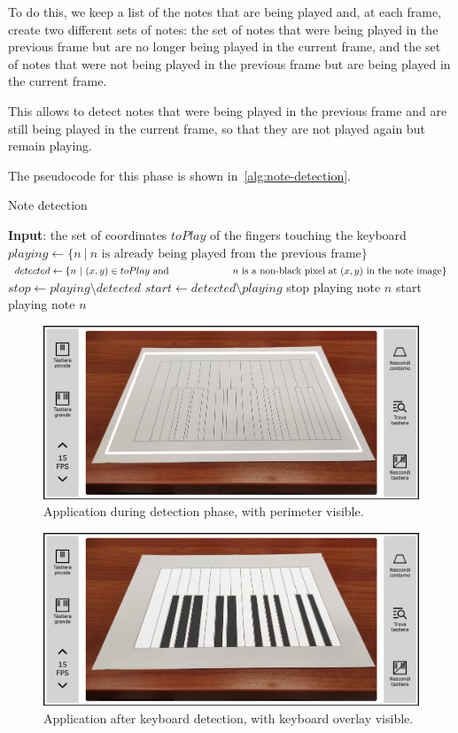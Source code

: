 To do this, we keep a list of the notes that are being played and, at each frame, create two different sets of notes:
the set of notes that were being played in the previous frame but are no longer being played in the current frame,
and the set of notes that were not being played in the previous frame but are being played in the current frame.

This allows to detect notes that were being played in the previous frame and are still being played in the current frame,
so that they are not played again but remain playing.

The pseudocode for this phase is shown in~\autoref{alg:note-detection}.

\begin{algorithm}
	\caption{Note detection}
	\begin{algorithmic}[1]
		\State \textbf{Input}: the set of coordinates $toPlay$ of the fingers touching the keyboard
		\State $playing \gets \{n \ | \ n \text{ is already being played from the previous frame}\}$
		\State $detected \gets \{ n \ | \ (x, y) \in toPlay \text{ and }\newline
		\hspace*{21.6mm} n \text{ is a non-black pixel at } (x, y) \text{ in the note image}\}$
		\State $stop \gets playing \setminus detected$
		\State $start \gets detected \setminus playing$
			\State stop playing note $n$
		\EndFor
			\State start playing note $n$
		\EndFor
	\end{algorithmic}
	\label{alg:note-detection}
\end{algorithm}

\begin{figure}[ht]
	\centering
	\includegraphics[width=\textwidth]{images/application/screenshots/detection-phase}
	\caption{Application during detection phase, with perimeter visible.}
	\label{fig:screenshot-detection-phase}
\end{figure}

\begin{figure}[ht]
	\centering
	\includegraphics[width=\textwidth]{images/application/screenshots/playing-phase}
	\caption{Application after keyboard detection, with keyboard overlay visible.}
	\label{fig:screenshot-playing-phase}
\end{figure}
